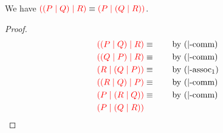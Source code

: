 \begin{lemma}[\ncEquivPoolAssNoParen2]\label{thm:nc-pool-assoc2}
  We have
  \(
    \textcolor{red}{((P \mid Q) \mid R)} \equiv
    \textcolor{red}{(P \mid (Q \mid R))}
  \).
\end{lemma}
\begin{proof}
  \begin{align*}
    \textcolor{red}{((P \mid Q) \mid R)} &\equiv \qquad \text{by \ensuremath{(|\text{-comm})}} \\
    \textcolor{red}{((Q \mid P) \mid R)} &\equiv \qquad \text{by \ensuremath{(|\text{-comm})}} \\
    \textcolor{red}{(R \mid (Q \mid P))} &\equiv \qquad \text{by \ensuremath{(|\text{-assoc}_1)}} \\
    \textcolor{red}{((R \mid Q) \mid P)} &\equiv \qquad \text{by \ensuremath{(|\text{-comm})}} \\
    \textcolor{red}{(P \mid (R \mid Q))} &\equiv \qquad \text{by \ensuremath{(|\text{-comm})}} \\
    \textcolor{red}{(P \mid (Q \mid R))}
  \end{align*}
\end{proof}
